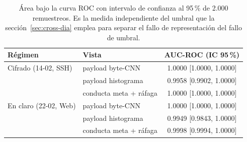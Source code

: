 \begin{table}[htbp]
  \centering
  \caption[AUC-ROC con intervalo bootstrap]{Área bajo la curva ROC con intervalo de confianza al 95\,\% de 2.000 remuestreos. Es la medida independiente del umbral que la sección~\ref{sec:cross-dia} emplea para separar el fallo de representación del fallo de umbral.}
  \label{tab:anexo-auc}
  \begin{tabular}{llc}
    \toprule
    \textbf{Régimen} & \textbf{Vista} & \textbf{AUC-ROC (IC 95\,\%)} \\
    \midrule
    Cifrado (14-02, SSH) & payload byte-CNN & 1.0000 [1.0000, 1.0000] \\
     & payload histograma & 0.9958 [0.9902, 1.0000] \\
     & conducta meta + ráfaga & 1.0000 [1.0000, 1.0000] \\
    \midrule
    En claro (22-02, Web) & payload byte-CNN & 1.0000 [1.0000, 1.0000] \\
     & payload histograma & 0.9949 [0.9843, 1.0000] \\
     & conducta meta + ráfaga & 0.9998 [0.9994, 1.0000] \\
    \bottomrule
  \end{tabular}
\end{table}
